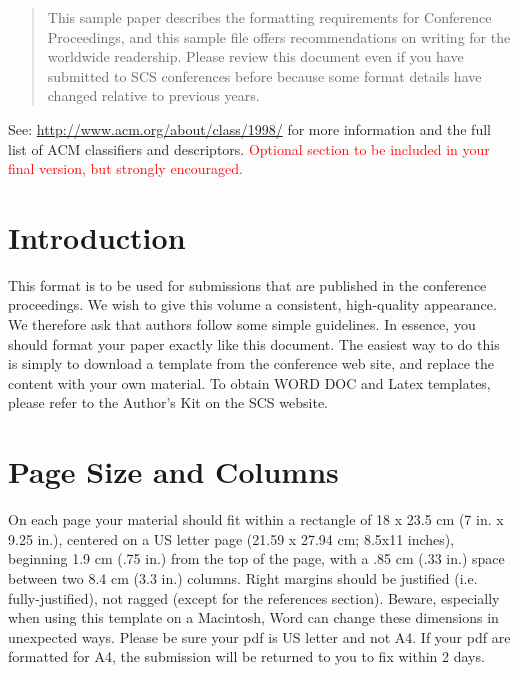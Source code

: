 \documentclass{scsPaperFormattingTemplate-LaTex-Revised20160302}
\begin{document}
\begin{abstract}
This sample paper describes the formatting requirements for Conference Proceedings, and this sample file offers recommendations on writing for the worldwide readership. Please review this document even if you have submitted to SCS conferences before because some format details have changed relative to previous years.
\end{abstract}


See: \url{http://www.acm.org/about/class/1998/} for more information and the full list of ACM classifiers and descriptors.
\textcolor{red}{Optional section to be included in your final version, but strongly encouraged.}

\section{Introduction}

This format is to be used for submissions that are published in the conference proceedings. We wish to give this volume a consistent, high-quality appearance. We therefore ask that authors follow some simple guidelines. In essence, you should format your paper exactly like this document. The easiest way to do this is simply to download a template from the conference web site, and replace the content with your own material. To obtain WORD DOC and Latex templates, please refer to the Author’s Kit on the SCS website.

\section{Page Size and Columns}

On each page your material should fit within a rectangle of 18 x 23.5 cm (7 in. x 9.25 in.), centered on a US letter page (21.59 x 27.94 cm; 8.5x11 inches), beginning 1.9 cm (.75 in.) from the top of the page, with a .85 cm (.33 in.) space between two 8.4 cm (3.3 in.) columns. Right margins should be justified (i.e. fully-justified), not ragged (except for the references section). Beware, especially when using this template on a Macintosh, Word can change these dimensions in unexpected ways.  Please be sure your pdf is US letter and not A4. If your pdf are formatted for A4, the submission will be returned to you to fix within 2 days.
\end{document}
